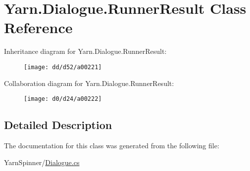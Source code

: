 \hypertarget{a00069}{\section{Yarn.\-Dialogue.\-Runner\-Result Class Reference}
\label{a00069}
}


Inheritance diagram for Yarn.\-Dialogue.\-Runner\-Result\-:
\nopagebreak
\begin{figure}[H]
\begin{center}
\leavevmode
\texttt{[image: dd/d52/a00221]}
\end{center}
\end{figure}


Collaboration diagram for Yarn.\-Dialogue.\-Runner\-Result\-:
\nopagebreak
\begin{figure}[H]
\begin{center}
\leavevmode
\texttt{[image: d0/d24/a00222]}
\end{center}
\end{figure}


\subsection{Detailed Description}


The documentation for this class was generated from the following file\-:\begin{DoxyCompactItemize}
\item 
Yarn\-Spinner/\hyperlink{a00117}{Dialogue.\-cs}\end{DoxyCompactItemize}
